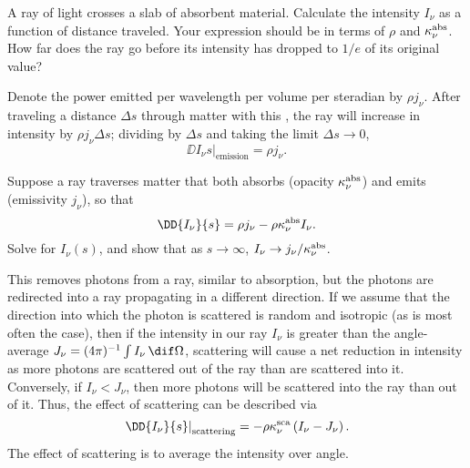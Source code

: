 \begin{exercisebox}
A ray of light crosses a slab of absorbent material. Calculate the intensity $I_{\nu}$ as a function of distance traveled. Your expression should be in terms of $\rho$ and $\kappa_\nu^{\mathrm{abs}}$. How far does the ray go before its intensity has dropped to $1/e$ of its original value?
\end{exercisebox}

 Denote the power emitted per wavelength per volume per steradian by $\rho j_{\nu}$. After traveling a distance $\Delta s$ through matter with this , the ray will increase in intensity by $\rho j_{\nu}\Delta s$; dividing by $\Delta s$ and taking the limit $\Delta s\to0$,
\begin{equation}\label{e.emission-microscopic}
\left.\DD{I_{\nu}}{s}\right|_{\mathrm{emission}} = \rho j_{\nu}.
\end{equation}

\begin{exercisebox}
Suppose a ray traverses matter that both absorbs (opacity $\kappa_\nu^{\mathrm{abs}}$) and emits (emissivity $j_{\nu}$), so that
\[	\DD{I_{\nu}}{s} = \rho j_{\nu} - \rho\kapabs I_{\nu}. \]
Solve for $I_{\nu}(s)$, and show that as $s\to\infty$, $I_{\nu}\to j_{\nu}/\kappa_\nu^{\mathrm{abs}}$.
\label{ex.intensity-at-large-depth}
\end{exercisebox}

 This removes photons from a ray, similar to absorption, but the photons are redirected into a ray propagating in a different direction. 
If we assume that the direction into which the photon is scattered is random and isotropic (as is most often the case), then if the intensity in our ray $I_{\nu}$ is greater than the angle-average $J_{\nu} = (4\pi)^{-1}\int I_{\nu}\,\dif\Omega$, scattering will cause a net reduction in intensity as more photons are scattered out of the ray than are scattered into it. Conversely, if $I_{\nu} < J_{\nu}$, then more photons will be scattered into the ray than out of it. Thus, the effect of scattering can be described via
\begin{equation}\label{e.scattering-microscopic}
\left.\DD{I_{\nu}}{s}\right|_{\mathrm{scattering}} = -\rho\kapscat \left(I_{\nu} - J_{\nu}\right).
\end{equation}
The effect of scattering is to average the intensity over angle.

